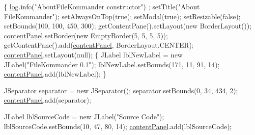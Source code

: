 \begin{DoxyCode}
                                \{
        \hyperlink{classcom_1_1poly_1_1nlp_1_1filekommander_1_1views_1_1_about_file_kommander_af5cbf6e6423901be93a2a580049f3728}{log}.info(\textcolor{stringliteral}{"AboutFileKommander constructor"}) ;
        setTitle(\textcolor{stringliteral}{"About FileKommander"});
        setAlwaysOnTop(\textcolor{keyword}{true});
        setModal(\textcolor{keyword}{true});
        setResizable(\textcolor{keyword}{false});
        setBounds(100, 100, 450, 300);
        getContentPane().setLayout(\textcolor{keyword}{new} BorderLayout());
        \hyperlink{classcom_1_1poly_1_1nlp_1_1filekommander_1_1views_1_1_about_file_kommander_ad925c308e870c6d3789d72cdec139c93}{contentPanel}.setBorder(\textcolor{keyword}{new} EmptyBorder(5, 5, 5, 5));
        getContentPane().add(\hyperlink{classcom_1_1poly_1_1nlp_1_1filekommander_1_1views_1_1_about_file_kommander_ad925c308e870c6d3789d72cdec139c93}{contentPanel}, BorderLayout.CENTER);
        \hyperlink{classcom_1_1poly_1_1nlp_1_1filekommander_1_1views_1_1_about_file_kommander_ad925c308e870c6d3789d72cdec139c93}{contentPanel}.setLayout(null);
        \{
            JLabel lblNewLabel = \textcolor{keyword}{new} JLabel(\textcolor{stringliteral}{"FileKommander 0.1"});
            lblNewLabel.setBounds(171, 11, 91, 14);
            \hyperlink{classcom_1_1poly_1_1nlp_1_1filekommander_1_1views_1_1_about_file_kommander_ad925c308e870c6d3789d72cdec139c93}{contentPanel}.add(lblNewLabel);
        \}
        
        JSeparator separator = \textcolor{keyword}{new} JSeparator();
        separator.setBounds(0, 34, 434, 2);
        \hyperlink{classcom_1_1poly_1_1nlp_1_1filekommander_1_1views_1_1_about_file_kommander_ad925c308e870c6d3789d72cdec139c93}{contentPanel}.add(separator);
        
        JLabel lblSourceCode = \textcolor{keyword}{new} JLabel(\textcolor{stringliteral}{"Source Code"});
        lblSourceCode.setBounds(10, 47, 80, 14);
        \hyperlink{classcom_1_1poly_1_1nlp_1_1filekommander_1_1views_1_1_about_file_kommander_ad925c308e870c6d3789d72cdec139c93}{contentPanel}.add(lblSourceCode);
        

\end{DoxyCode}
